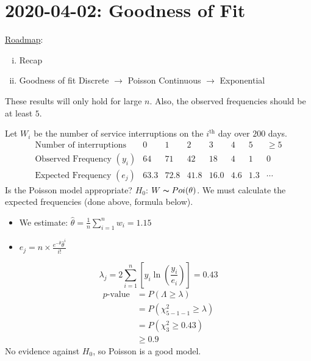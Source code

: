 \section{2020-04-02: Goodness of Fit}
\underline{Roadmap}:
\begin{enumerate}[(i)]
    \item Recap
    \item Goodness of fit
          \subitem Discrete $ \rightarrow $ Poisson
          \subitem Continuous $ \rightarrow $ Exponential
\end{enumerate}
These results will only hold for large $ n $. Also,
the observed frequencies should be at least $ 5 $.

\begin{exbox}
    \begin{example}[Poisson]
        Let $ W_i $ be the number of service interruptions on the $ i^{\text{th}} $ day
        over $ 200 $ days.
        \[
            \begin{array}{cccccccc}
                \text{Number of interruptions}   & 0    & 1    & 2    & 3    & 4   & 5   & \geqslant 5 \\
                \text{Observed Frequency } (y_i) & 64   & 71   & 42   & 18   & 4   & 1   & 0           \\
                \text{Expected Frequency } (e_j) & 63.3 & 72.8 & 41.8 & 16.0 & 4.6 & 1.3 & \cdots
            \end{array}
        \]
        Is the Poisson model appropriate? $ H_0 $: $ W \thicksim Poi(\theta) $.
        We must calculate the expected frequencies (done above, formula below).
        \begin{itemize}
            \item We estimate: $ \hat{\theta}=\frac{1}{n} \sum\limits_{i=1}^{n} w_i=1.15 $
            \item $ e_j=n\times \frac{e^{-\hat{\theta}}\hat{\theta}^i}{i!} $
        \end{itemize}
        \[ \lambda_j=2 \sum\limits_{i=1}^{n} \left[ y_i \ln\left( \frac{y_i}{e_i} \right) \right]=0.43 \]
        \begin{align*}
            p\text{-value}
             & =P(\Lambda\geqslant \lambda)        \\
             & =P(\chi^2_{5-1-1}\geqslant \lambda) \\
             & =P(\chi^2_3\geqslant 0.43)          \\
             & \geqslant 0.9
        \end{align*}
        No evidence against $ H_0 $, so Poisson is a good model.
    \end{example}
\end{exbox}
